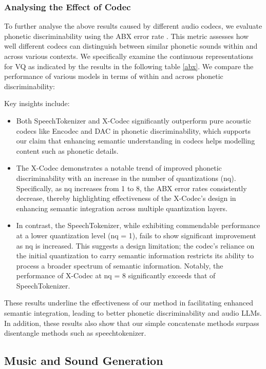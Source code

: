 \subsubsection{Analysing the Effect of Codec}
To further analyse the above results caused by different audio codecs, we evaluate phonetic discriminability using the ABX error rate \cite{schatz2013evaluating}. This metric assesses how well different codecs can distinguish between similar phonetic sounds within and across various contexts. We specifically examine the continuous representations for VQ as indicated by the results in the following table \ref{abx}. We compare the performance of various models in terms of within and across phonetic discriminability:

Key insights include:
\begin{itemize}
\item Both SpeechTokenizer and X-Codec significantly outperform pure acoustic codecs like Encodec and DAC in phonetic discriminability, which supports our claim that enhancing semantic understanding in codecs helps modelling content such as phonetic details.
\item The X-Codec demonstrates a notable trend of improved phonetic discriminability with an increase in the number of quantizations (nq). Specifically, as nq increases from 1 to 8, the ABX error rates consistently decrease, thereby highlighting effectiveness of the X-Codec's design in enhancing semantic integration across multiple quantization layers.

\item In contrast, the SpeechTokenizer, while exhibiting commendable performance at a lower quantization level (nq = 1), fails to show significant improvement as nq is increased. This suggests a design limitation; the codec's reliance on the initial quantization to carry semantic information restricts its ability to process a broader spectrum of semantic information. Notably, the performance of X-Codec at nq = 8 significantly exceeds that of SpeechTokenizer.
\end{itemize}

These results underline the effectiveness of our method in facilitating enhanced semantic integration, leading to better phonetic discriminability and audio LLMs. In addition, these results also show that our simple concatenate methods surpass disentangle methods such as speechtokenizer.

\subsection{Music and Sound Generation}



